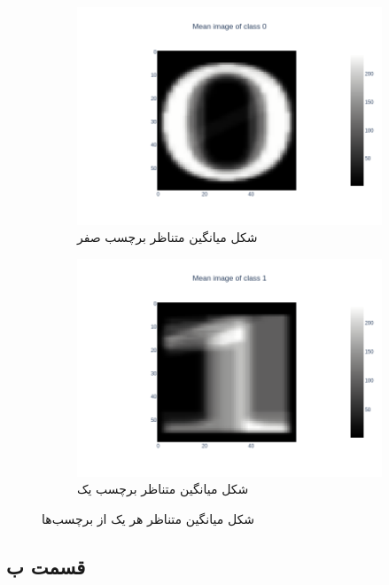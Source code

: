 \documentclass{article}
\begin{document}
\begin{figure}[h]
    \begin{subfigure}{.48\linewidth}
        \centering
        \includegraphics[width=\linewidth]{images/q2/parta/0_prototype.png}
        \caption{شکل میانگین متناظر برچسب صفر}
    \end{subfigure}
    \hfill
    \begin{subfigure}{.48\linewidth}
        \centering
        \includegraphics[width=\linewidth]{images/q2/parta/1_prototype.png}
        \caption{شکل میانگین متناظر برچسب یک}
    \end{subfigure}
    \caption{شکل میانگین متناظر هر یک از برچسب‌ها}
    \label{q2-parta}
\end{figure}

\subsection*{قسمت ب}
\end{document}
